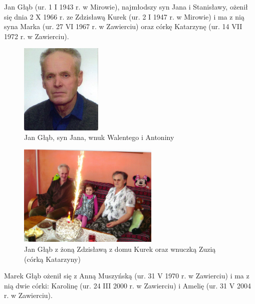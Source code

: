 Jan Głąb (ur. 1 I 1943 r. w Mirowie), najmłodszy syn Jana i Stanisławy, ożenił się dnia 2 X 1966 r. ze Zdzisławą Kurek (ur. 2 I 1947 r. w Mirowie) i ma z nią syna Marka (ur. 27 VI 1967 r. w Zawierciu) oraz córkę Katarzynę (ur. 14 VII 1972 r. w Zawierciu).

\begin{figure}[!h]
\begin{center}
\includegraphics[width=0.35\textwidth]{zdjecia/jan_glab_junior.jpg}
\caption[Jan Głąb]{Jan Głąb, syn Jana, wnuk Walentego i Antoniny}
\label{rys:jan_glab_junior}
\end{center}
\end{figure}

\begin{figure}[!h]
\begin{center}
\includegraphics[width=0.6\textwidth]{zdjecia/jan_i_zdzislawa_glabowie.jpg}
\caption[Jan Głąb z żoną Zdzisławą z domu Kurek oraz wnuczką Zuzią]{Jan Głąb z żoną Zdzisławą z domu Kurek oraz wnuczką Zuzią (córką Katarzyny)}
\label{rys:jan_i_zdzislawa_glabowie}
\end{center}
\end{figure}

Marek Głąb ożenił się z Anną Muszyńską (ur. 31 V 1970 r. w Zawierciu) i ma z nią dwie córki: Karolinę (ur. 24 III 2000 r. w Zawierciu) i Amelię (ur. 31 V 2004 r. w Zawierciu).

